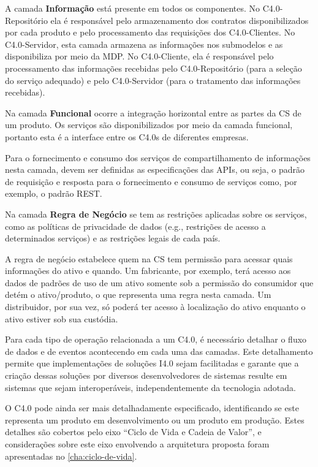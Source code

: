 A camada \textbf{Informação} está presente em todos os componentes. No C4.0-Repositório ela é responsável pelo armazenamento dos contratos disponibilizados por cada produto e pelo processamento das requisições dos C4.0-Clientes. No C4.0-Servidor, esta camada armazena as informações nos submodelos e as disponibiliza por meio da MDP. No C4.0-Cliente, ela é responsável pelo processamento das informações recebidas pelo C4.0-Repositório (para a seleção do serviço adequado) e pelo C4.0-Servidor (para o tratamento das informações recebidas).

Na camada \textbf{Funcional} ocorre a integração horizontal entre as partes da CS de um produto. Os serviços são disponibilizados por meio da camada funcional, portanto esta é a interface entre os C4.0s de diferentes empresas.

Para o fornecimento e consumo dos serviços de compartilhamento de informações nesta camada, devem ser definidas as especificações das APIs, ou seja, o padrão de requisição e resposta para o fornecimento e consumo de serviços como, por exemplo, o padrão REST.

Na camada \textbf{Regra de Negócio} se tem as restrições aplicadas sobre os serviços, como as políticas de privacidade de dados (e.g., restrições de acesso a determinados serviços) e as restrições legais de cada país.

A regra de negócio estabelece quem na CS tem permissão para acessar quais informações do ativo e quando. Um fabricante, por exemplo, terá acesso aos dados de padrões de uso de um ativo somente sob a permissão do consumidor que detém o ativo/produto, o que representa uma regra nesta camada. Um distribuidor, por sua vez, só poderá ter acesso à localização do ativo enquanto o ativo estiver sob sua custódia.

Para cada tipo de operação relacionada a um C4.0, é necessário detalhar o fluxo de dados e de eventos acontecendo em cada uma das camadas. Este detalhamento permite que implementações de soluções I4.0 sejam facilitadas e garante que a criação dessas soluções por diversos desenvolvedores de sistemas resulte em sistemas que sejam interoperáveis, independentemente da tecnologia adotada.

O C4.0 pode ainda ser mais detalhadamente especificado, identificando se este representa um produto em desenvolvimento ou um produto em produção. Estes detalhes são cobertos pelo eixo ``Ciclo de Vida e Cadeia de Valor'', e considerações sobre este eixo envolvendo a arquitetura proposta foram apresentadas no \autoref{cha:ciclo-de-vida}.

